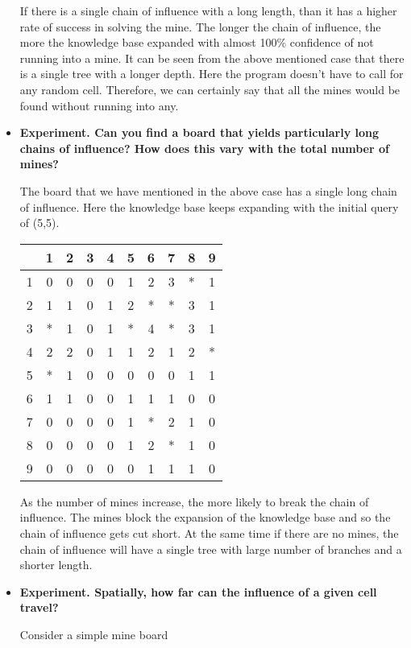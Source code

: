 \begin{itemize}
If there is a single chain of influence with a long length, than it has a higher rate of success in solving the mine. The longer the chain of influence, the more the knowledge base expanded with almost 100\% confidence of not running into a mine. It can be seen from the above mentioned case that there is a single tree with a longer depth. Here the program doesn't have to call for any random cell. Therefore, we can certainly say that all the mines would be found without running into any.

\item
\textbf{Experiment. Can you find a board that yields particularly long chains of influence? How 	does this vary with the total number of mines?}

The board that we have mentioned in the above case has a single long chain of influence. Here the knowledge base keeps expanding with the initial query of (5,5).

\begin{tabular}{|c|c|c|c|c|c|c|c|c|c|}
\hline
  & 1 & 2 & 3 & 4 & 5 & 6 & 7 & 8 & 9\\
\hline
1 & 0 & 0 & 0 & 0 & 1 & 2 & 3 & * & 1\\
\hline
2 & 1 & 1 & 0 & 1 & 2 & * & * & 3 & 1\\
\hline
3 & * & 1 & 0 & 1 & * & 4 & * & 3 & 1\\
\hline
4 & 2 & 2 & 0 & 1 & 1 & 2 & 1 & 2 & *\\
\hline
5 & * & 1 & 0 & 0 & 0 & 0 & 0 & 1 & 1\\
\hline
6 & 1 & 1 & 0 & 0 & 1 & 1 & 1 & 0 & 0\\
\hline
7 & 0 & 0 & 0 & 0 & 1 & * & 2 & 1 & 0\\
\hline
8 & 0 & 0 & 0 & 0 & 1 & 2 & * & 1 & 0\\
\hline
9 & 0 & 0 & 0 & 0 & 0 & 1 & 1 & 1 & 0\\
\hline
\end{tabular}

As the number of mines increase, the more likely to break the chain of influence. The mines block the expansion of the knowledge base and so the chain of influence gets cut short. At the same time if there are no mines, the chain of influence will have a single tree with large number of branches and a shorter length.

\item
\textbf{Experiment. Spatially, how far can the influence of a given cell travel?}

Consider a simple mine board


\end{itemize}
